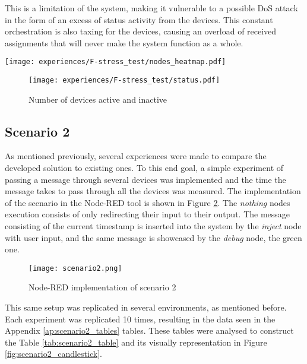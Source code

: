 This is a limitation of the system, making it vulnerable to a possible DoS attack in the form of an excess of status activity from the devices. This constant orchestration is also taxing for the devices, causing an overload of received assignments that will never make the system function as a whole.

\begin{figure*}[h]
    \centering
    \texttt{[image: experiences/F-stress\_test/nodes\_heatmap.pdf]}
    \caption[Nodes assignment distribution]{Nodes assignment distribution}\label{fig:stress_test_nodes}
\end{figure*}

\begin{figure}[h]
\centering
\texttt{[image: experiences/F-stress\_test/status.pdf]}
\caption[Number of devices active and inactive]{Number of devices active and inactive}\label{fig:stress_test_status}
\end{figure}


\subsection{Scenario 2}\label{sec:discussion_scenario2}

As mentioned previously, several experiences were made to compare the developed solution to existing ones. To this end goal, a simple experiment of passing a message through several devices was implemented and the time the message takes to pass through all the devices was measured. The implementation of the scenario in the Node-RED tool is shown in Figure \ref{fig:scenario2_node_red}. The \textit{nothing} nodes execution consists of only redirecting their input to their output. The message consisting of the current timestamp is inserted into the system by the \textit{inject} node with user input, and the same message is showcased by the \textit{debug} node, the green one.

\begin{figure}[h]
\centering
\texttt{[image: scenario2.png]}
\caption[Node-RED implementation of scenario 2]{Node-RED implementation of scenario 2}\label{fig:scenario2_node_red}
\end{figure}

This same setup was replicated in several environments, as mentioned before. Each experiment was replicated 10 times, resulting in the data seen in the Appendix \ref{ap:scenario2_tables} tables. These tables were analysed to construct the Table \ref{tab:scenario2_table} and its visually representation in Figure \ref{fig:scenario2_candlestick}.

